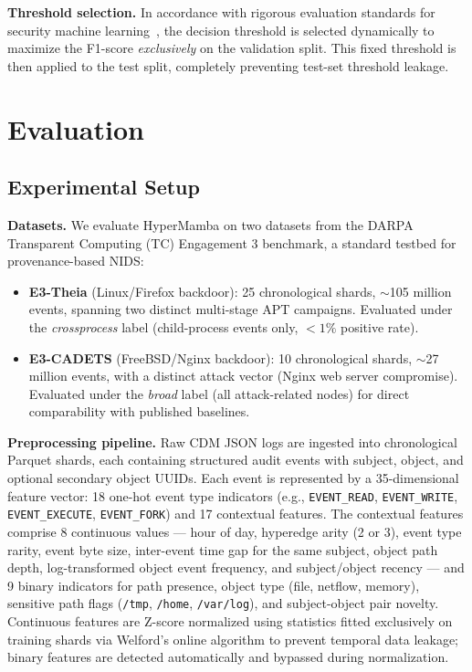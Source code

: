 \documentclass[letterpaper,twocolumn,10pt]{article}
\begin{document}
\textbf{Threshold selection.} In accordance with rigorous evaluation standards for security machine learning~\cite{arp2022dos}, the decision threshold is selected dynamically to maximize the F1-score \emph{exclusively} on the validation split. This fixed threshold is then applied to the test split, completely preventing test-set threshold leakage.

\section{Evaluation}
\label{sec:evaluation}

\subsection{Experimental Setup}
\label{sec:experimental_setup}

\textbf{Datasets.} We evaluate HyperMamba on two datasets from the DARPA Transparent Computing (TC) Engagement 3 benchmark, a standard testbed for provenance-based NIDS:
\begin{itemize}
    \item \textbf{E3-Theia} (Linux/Firefox backdoor): 25 chronological shards, $\sim$105 million events, spanning two distinct multi-stage APT campaigns. Evaluated under the \emph{crossprocess} label (child-process events only, $<1\%$ positive rate).
    \item \textbf{E3-CADETS} (FreeBSD/Nginx backdoor): 10 chronological shards, $\sim$27 million events, with a distinct attack vector (Nginx web server compromise). Evaluated under the \emph{broad} label (all attack-related nodes) for direct comparability with published baselines.
\end{itemize}

\textbf{Preprocessing pipeline.} Raw CDM JSON logs are ingested into chronological Parquet shards, each containing structured audit events with subject, object, and optional secondary object UUIDs. Each event is represented by a 35-dimensional feature vector: 18 one-hot event type indicators (e.g., \texttt{EVENT\_READ}, \texttt{EVENT\_WRITE}, \texttt{EVENT\_EXECUTE}, \texttt{EVENT\_FORK}) and 17 contextual features. The contextual features comprise 8 continuous values --- hour of day, hyperedge arity (2 or 3), event type rarity, event byte size, inter-event time gap for the same subject, object path depth, log-transformed object event frequency, and subject/object recency --- and 9 binary indicators for path presence, object type (file, netflow, memory), sensitive path flags (\texttt{/tmp}, \texttt{/home}, \texttt{/var/log}), and subject-object pair novelty. Continuous features are Z-score normalized using statistics fitted exclusively on training shards via Welford's online algorithm to prevent temporal data leakage; binary features are detected automatically and bypassed during normalization.
\end{document}
